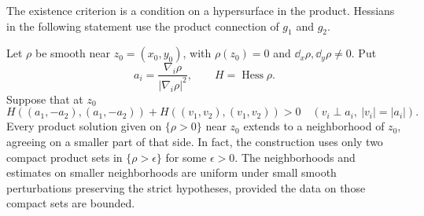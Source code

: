 The existence criterion is a condition on a hypersurface in the
product.  Hessians in the following statement use the product
connection of $g_1$ and $g_2$.

\begin{proposition}\label{cross:criterion}
Let $\rho$ be smooth near $z_0=(x_0,y_0)$, with $\rho(z_0)=0$ and
$\dd_x\rho,\dd_y\rho\ne0$.  Put
\[
 a_i=\frac{\nabla_i\rho}{|\nabla_i\rho|^2},\qquad H=\operatorname{Hess}\rho.
\]
Suppose that at $z_0$
\begin{equation}\label{cross:hessian-test}
 H((a_1,-a_2),(a_1,-a_2))
 +H((v_1,v_2),(v_1,v_2))>0
 \quad
 \left(v_i\perp a_i,\ |v_i|=|a_i|\right).
\end{equation}
Every product solution given on $\{\rho>0\}$ near $z_0$ extends to
a neighborhood of $z_0$, agreeing on a smaller part of that side.
In fact, the construction uses only two compact product sets in
$\{\rho>\epsilon\}$ for some $\epsilon>0$.
The neighborhoods and estimates on smaller neighborhoods are uniform
under small smooth perturbations preserving the strict hypotheses,
provided the data on those compact sets are bounded.
\end{proposition}

